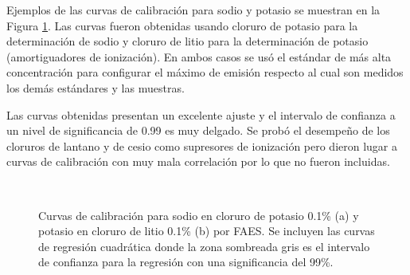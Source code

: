 Ejemplos de las curvas de calibración para sodio y potasio se muestran en la Figura \ref{fig:SodPot}. Las curvas fueron obtenidas usando cloruro de potasio para la determinación de sodio y cloruro de litio para la determinación de potasio (amortiguadores de ionización). En ambos casos se usó el estándar de más alta concentración para configurar el máximo de emisión respecto al cual son medidos los demás estándares y las muestras.

Las curvas obtenidas presentan un excelente ajuste y el intervalo de confianza a un nivel de significancia de 0.99 es muy delgado. Se probó el desempeño de los cloruros de lantano y de cesio como supresores de ionización pero dieron lugar a curvas de calibración con muy mala correlación por lo que no fueron incluidas. 

\begin{figure}[H]
    \centering
    \\
    \caption[Curvas de calibración para sodio y potasio por FAES.]{Curvas de calibración para sodio en cloruro de potasio 0.1\% (a) y potasio en cloruro de litio 0.1\% (b) por FAES. Se incluyen las curvas de regresión cuadrática donde la zona sombreada gris es el intervalo de confianza para la regresión con una significancia del 99\%.}
    \label{fig:SodPot}
\end{figure}


